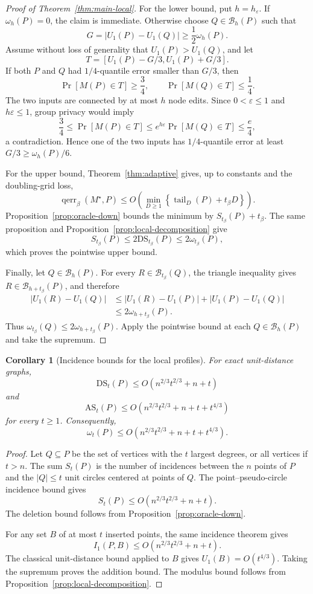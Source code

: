 \documentclass[11pt]{article}
\newtheorem{corollary}[theorem]{Corollary}
\newcommand{\eps}{\varepsilon}
\newcommand{\tail}{\operatorname{tail}}
\begin{document}
\begin{proof}[Proof of Theorem~\ref{thm:main-local}]
For the lower bound, put \(h=h_\eps\). If \(\omega_h(P)=0\), the claim is immediate. Otherwise choose \(Q\in\mathcal B_h(P)\) such that
\[
G=|U_1(P)-U_1(Q)|\ge \frac12\omega_h(P).
\]
Assume without loss of generality that \(U_1(P)>U_1(Q)\), and let
\[
T=[U_1(P)-G/3,U_1(P)+G/3].
\]
If both \(P\) and \(Q\) had \(1/4\)-quantile error smaller than \(G/3\), then
\[
\Pr[M(P)\in T]\ge\frac34,
\qquad
\Pr[M(Q)\in T]\le\frac14.
\]
The two inputs are connected by at most \(h\) node edits. Since \(0<\eps\le1\) and \(h\eps\le1\), group privacy would imply
\[
\frac34\le \Pr[M(P)\in T]
\le e^{h\eps}\Pr[M(Q)\in T]
\le \frac e4,
\]
a contradiction. Hence one of the two inputs has \(1/4\)-quantile error at least \(G/3\ge\omega_h(P)/6\).

For the upper bound, Theorem~\ref{thm:adaptive} gives, up to constants and the doubling-grid loss,
\[
\operatorname{qerr}_\beta(M^\star,P)
\le O\!\left(
\min_{D\ge1}\left\{\tail_D(P)+t_\beta D\right\}
\right).
\]
Proposition~\ref{prop:oracle-down} bounds the minimum by \(S_{t_\beta}(P)+t_\beta\). The same proposition and Proposition~\ref{prop:local-decomposition} give
\[
S_{t_\beta}(P)\le2\mathrm{DS}_{t_\beta}(P)
\le2\omega_{t_\beta}(P),
\]
which proves the pointwise upper bound.

Finally, let \(Q\in\mathcal B_h(P)\). For every \(R\in\mathcal B_{t_\beta}(Q)\), the triangle inequality gives \(R\in\mathcal B_{h+t_\beta}(P)\), and therefore
\begin{align*}
|U_1(R)-U_1(Q)|
&\le |U_1(R)-U_1(P)|+|U_1(P)-U_1(Q)|\\
&\le 2\omega_{h+t_\beta}(P).
\end{align*}
Thus \(\omega_{t_\beta}(Q)\le2\omega_{h+t_\beta}(P)\). Apply the pointwise bound at each \(Q\in\mathcal B_h(P)\) and take the supremum.
\end{proof}

\begin{corollary}[Incidence bounds for the local profiles]
\label{cor:local-incidence}
For exact unit-distance graphs,
\[
\mathrm{DS}_t(P)\le O(n^{2/3}t^{2/3}+n+t)
\]
and
\[
\mathrm{AS}_t(P)
\le O(n^{2/3}t^{2/3}+n+t+t^{4/3})
\]
for every \(t\ge1\). Consequently,
\[
\omega_t(P)
\le O(n^{2/3}t^{2/3}+n+t+t^{4/3}).
\]
\end{corollary}

\begin{proof}
Let \(Q\subseteq P\) be the set of vertices with the \(t\) largest degrees, or all vertices if \(t>n\). The sum \(S_t(P)\) is the number of incidences between the \(n\) points of \(P\) and the \(|Q|\le t\) unit circles centered at points of \(Q\). The point--pseudo-circle incidence bound gives
\[
S_t(P)\le O(n^{2/3}t^{2/3}+n+t).
\]
The deletion bound follows from Proposition~\ref{prop:oracle-down}.

For any set \(B\) of at most \(t\) inserted points, the same incidence theorem gives
\[
I_1(P,B)\le O(n^{2/3}t^{2/3}+n+t).
\]
The classical unit-distance bound applied to \(B\) gives \(U_1(B)=O(t^{4/3})\). Taking the supremum proves the addition bound. The modulus bound follows from Proposition~\ref{prop:local-decomposition}.
\end{proof}
\end{document}
